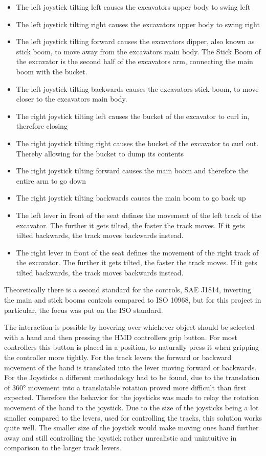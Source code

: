 \documentclass[journal]{vgtc}                     %
\begin{document}
\begin{itemize}
  \item The left joystick tilting left causes the excavators upper body to swing left
  \item The left joystick tilting right causes the excavators upper body to swing right
  \item The left joystick tilting forward causes the excavators dipper, also known as stick boom, to move away from the excavators main body.
           The Stick Boom of the excavator is the second half of the excavators arm, connecting the main boom with the bucket.
  \item The left joystick tilting backwards causes the excavators stick boom, to move closer to the excavators main body.
  \item The right joystick tilting left causes the bucket of the excavator to curl in, therefore closing
  \item The right joystick tilting right causes the bucket of the excavator to curl out. Thereby allowing for the bucket to dump its contents
  \item The right joystick tilting forward causes the main boom and therefore the entire arm to go down
  \item The right joystick tilting backwards causes the main boom to go back up 
  \item The left lever in front of the seat defines the movement of the left track of the excavator. The further it gets tilted, the faster the track moves. If it gets tilted backwards, the track moves backwards instead.
  \item The right lever in front of the seat defines the movement of the right track of the excavator. The further it gets tilted, the faster the track moves. If it gets tilted backwards, the track moves backwards instead.
\end{itemize}
Theoretically there is a second standard for the controls, SAE J1814, inverting the main and stick booms controls compared to ISO 10968, but for this project in particular, the focus was put on the ISO standard.

The interaction is possible by hovering over whichever object should be selected with a hand and then pressing the HMD controllers grip button. For most controllers this button is placed in a position, to naturally press it when gripping the controller more tightly. For the track levers the forward or backward movement of the hand is translated into the lever moving forward or backwards. For the Joysticks a different methodology had to be found, due to the translation of 360° movement into a translatable rotation proved more difficult than first expected. Therefore the behavior for the joysticks was made to relay the rotation movement of the hand to the joystick. Due to the size of the joysticks being a lot smaller compared to the levers, used for controlling the tracks, this solution works quite well. The smaller size of the joystick would make moving ones hand further away and still controlling the joystick rather unrealistic and unintuitive in comparison to the larger track levers.
\end{document}
